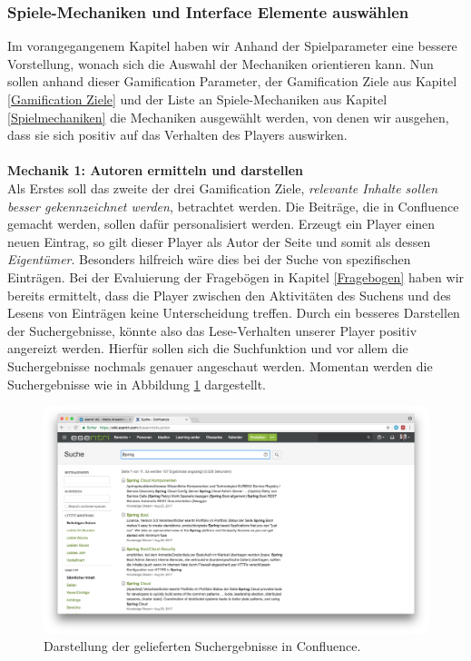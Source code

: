 \documentclass[a4paper,12pt,twoside]{scrartcl}
\begin{document}
\subsubsection{Spiele-Mechaniken und Interface Elemente auswählen}
Im vorangegangenem Kapitel haben wir Anhand der Spielparameter eine bessere Vorstellung, wonach sich die Auswahl der Mechaniken orientieren kann. Nun sollen anhand dieser Gamification Parameter, der Gamification Ziele aus Kapitel \ref{Gamification Ziele} und der Liste an Spiele-Mechaniken aus Kapitel \ref{Spielmechaniken} die Mechaniken ausgewählt werden, von denen wir ausgehen, dass sie sich positiv auf das Verhalten des Players auswirken. 
\\\\
\textbf{Mechanik 1: Autoren ermitteln und darstellen}\\
Als Erstes soll das zweite der drei Gamification Ziele, \textit{relevante Inhalte sollen besser gekennzeichnet werden}, betrachtet werden. Die Beiträge, die in Confluence gemacht werden, sollen dafür personalisiert werden. Erzeugt ein Player einen neuen Eintrag, so gilt dieser Player als Autor der Seite und somit als dessen \textit{Eigentümer}. Besonders hilfreich wäre dies bei der Suche von spezifischen Einträgen. Bei der Evaluierung der Fragebögen in Kapitel \ref{Fragebogen} haben wir bereits ermittelt, dass die Player zwischen den Aktivitäten des Suchens und des Lesens von Einträgen keine Unterscheidung treffen. Durch ein besseres Darstellen der Suchergebnisse, könnte also das Lese-Verhalten unserer Player positiv angereizt werden. Hierfür sollen sich die Suchfunktion und vor allem die Suchergebnisse nochmals genauer angeschaut werden. Momentan werden die Suchergebnisse wie in Abbildung \ref{Suchergebnisse} dargestellt.
\\
\begin{figure}[h!]
\begin{center}
\includegraphics[scale = 0.1]{Bilder/Suchergebnisse.png}
\caption{Darstellung der gelieferten Suchergebnisse in Confluence.}
\label{Suchergebnisse}
\end{center}
\end{figure}
\end{document}

